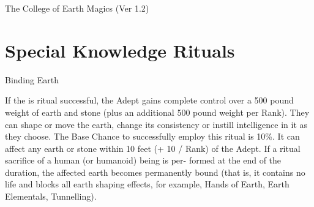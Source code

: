 \begin{Chapter}{The College of Earth Magics (Ver 1.2)}
\section{Special Knowledge Rituals}


\begin{ritual}[R-1]{Binding Earth }

\begin{effects}
If the is ritual successful, the Adept gains complete control over a
500 pound weight of earth and stone (plus an additional 500 pound
weight per Rank).  They can shape or move the earth, change its
consistency or instill intelligence in it as they choose.  The Base
Chance to successfully employ this ritual is 10\%.  It can affect any
earth or stone within 10 feet (+ 10 / Rank) of the Adept. If a ritual
sacrifice of a human (or humanoid) being is per- formed at the end of
the duration, the affected earth becomes permanently bound (that is,
it contains no life and blocks all earth shaping effects, for example,
Hands of Earth, Earth Elementals, Tunnelling).
\end{effects}
\end{ritual}

\end{Chapter}
